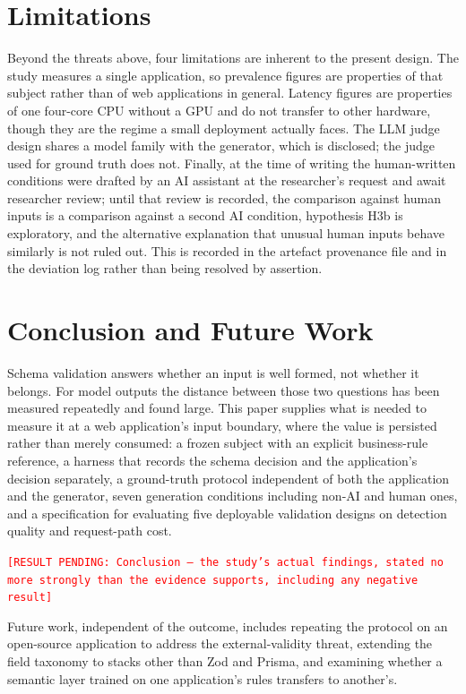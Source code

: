 \documentclass[conference]{IEEEtran}
\newcommand{\pending}[1]{\textcolor{red}{\texttt{[RESULT PENDING: #1]}}}
\begin{document}
\section{Limitations}
\label{sec:limitations}

Beyond the threats above, four limitations are inherent to the present design. The study measures a
single application, so prevalence figures are properties of that subject rather than of web
applications in general. Latency figures are properties of one four-core CPU without a GPU and do not
transfer to other hardware, though they are the regime a small deployment actually faces. The LLM
judge design shares a model family with the generator, which is disclosed; the judge used for ground
truth does not. Finally, at the time of writing the human-written conditions were drafted by an AI
assistant at the researcher's request and await researcher review; until that review is recorded, the
comparison against human inputs is a comparison against a second AI condition, hypothesis H3b is
exploratory, and the alternative explanation that unusual human inputs behave similarly is not ruled
out. This is recorded in the artefact provenance file and in the deviation log rather than being
resolved by assertion.

\section{Conclusion and Future Work}
\label{sec:conclusion}

Schema validation answers whether an input is well formed, not whether it belongs. For model outputs
the distance between those two questions has been measured repeatedly and found large. This paper
supplies what is needed to measure it at a web application's input boundary, where the value is
persisted rather than merely consumed: a frozen subject with an explicit business-rule reference, a
harness that records the schema decision and the application's decision separately, a ground-truth
protocol independent of both the application and the generator, seven generation conditions including
non-AI and human ones, and a specification for evaluating five deployable validation designs on
detection quality and request-path cost.

\pending{Conclusion --- the study's actual findings, stated no more strongly than the evidence
supports, including any negative result}

Future work, independent of the outcome, includes repeating the protocol on an open-source
application to address the external-validity threat, extending the field taxonomy to stacks other
than Zod and Prisma, and examining whether a semantic layer trained on one application's rules
transfers to another's.
\end{document}
